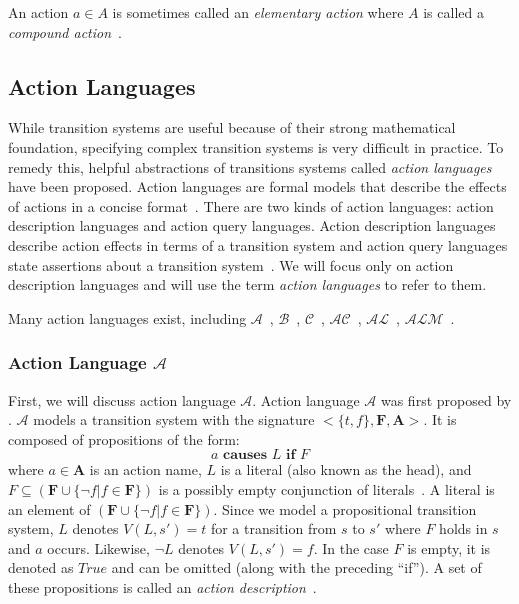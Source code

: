 \begin{definition}
    An action $a \in A$ is sometimes called an \textit{elementary action} where $A$ is called a \textit{compound action}~\citep{gelfond_authorization_2008}.
\end{definition}

\subsection{Action Languages}
\label{subsec:action_languages}

While transition systems are useful because of their strong mathematical foundation, specifying complex transition systems is very difficult in practice.
To remedy this, helpful abstractions of transitions systems called \textit{action languages} have been proposed.
Action languages are formal models that describe the effects of actions in a concise format~\citep{gelfond_action_1998}.
There are two kinds of action languages: action description languages and action query languages.
Action description languages describe action effects in terms of a transition system and action query languages state assertions about a transition system~\citep{gelfond_action_1998}.
We will focus only on action description languages and will use the term \textit{action languages} to refer to them.

Many action languages exist, including $\mathcal{A}$~\citep{gelfond_action_1998}, $\mathcal{B}$~\citep{gelfond_action_1998}, $\mathcal{C}$~\citep{gelfond_action_1998}, $\mathcal{AC}$~\citep{turner_representing_1997}, $\mathcal{AL}$~\citep{baral_reasoning_2000}, $\mathcal{ALM}$~\citep{inclezan_modular_2016}.

\subsubsection{Action Language $\mathcal{A}$}
\label{subsubsec:action_language_a}

First, we will discuss action language $\mathcal{A}$.
Action language $\mathcal{A}$ was first proposed by \citet{pednault_formulating_1987}.
$\mathcal{A}$ models a transition system with the signature $ <\{t, f\}, \boldsymbol{F}, \boldsymbol{A}> $.
It is composed of propositions of the form:
\begin{equation}
    a \textbf{ causes } L \textbf{ if } F
\end{equation}
where $ a \in \boldsymbol{A} $ is an action name, $ L $ is a literal (also known as the head), and $ F \subseteq(\boldsymbol{F} \cup\{\neg f | f \in \boldsymbol{F}\}) $ is a possibly empty conjunction of literals~\citep{gelfond_action_1998}.
A literal is an element of $(\boldsymbol{F} \cup \{\neg f | f \in \boldsymbol{F}\})$.
Since we model a propositional transition system, $L$ denotes $V(L, s') = t$ for a transition from $s$ to $s'$ where $F$ holds in $s$ and $a$ occurs.
Likewise, $\neg L$ denotes $V(L, s')=f$.
In the case $ F $ is empty, it is denoted as $ True $ and can be omitted (along with the preceding ``if'').
A set of these propositions is called an \textit{action description}~\citep{gelfond_action_1998}.

